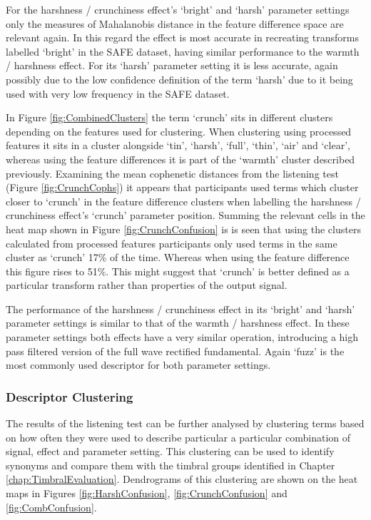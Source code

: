 			For the harshness / crunchiness effect's `bright' and `harsh' parameter settings only the measures
			of Mahalanobis distance in the feature difference space are relevant again. In this regard the
			effect is most accurate in recreating transforms labelled `bright' in the SAFE dataset, having
			similar performance to the warmth / harshness effect. For its `harsh' parameter setting it is less
			accurate, again possibly due to the low confidence definition of the term `harsh' due to it being
			used with very low frequency in the SAFE dataset.

			In Figure \ref{fig:CombinedClusters} the term `crunch' sits in different clusters depending on the
			features used for clustering. When clustering using processed features it sits in a cluster
			alongside `tin', `harsh', `full', `thin', `air' and `clear', whereas using the feature differences
			it is part of the `warmth' cluster described previously. Examining the mean cophenetic distances
			from the listening test (Figure \ref{fig:CrunchCophs}) it appears that participants used terms
			which cluster closer to `crunch' in the feature difference clusters when labelling the harshness /
			crunchiness effect's `crunch' parameter position. Summing the relevant cells in the heat map shown
			in Figure \ref{fig:CrunchConfusion} is is seen that using the clusters calculated from processed
			features participants only used terms in the same cluster as `crunch' 17\% of the time. Whereas
			when using the feature difference this figure rises to 51\%. This might suggest that `crunch' is
			better defined as a particular transform rather than properties of the output signal.

			The performance of the harshness / crunchiness effect in its `bright' and `harsh' parameter
			settings is similar to that of the warmth / harshness effect. In these parameter settings both
			effects have a very similar operation, introducing a high pass filtered version of the full wave
			rectified fundamental. Again `fuzz' is the most commonly used descriptor for both parameter
			settings.

		\subsubsection*{Descriptor Clustering}
			The results of the listening test can be further analysed by clustering terms based on how often
			they were used to describe particular a particular combination of signal, effect and parameter
			setting. This clustering can be used to identify synonyms and compare them with the timbral groups
			identified in Chapter \ref{chap:TimbralEvaluation}. Dendrograms of this clustering are shown on the
			heat maps in Figures \ref{fig:HarshConfusion}, \ref{fig:CrunchConfusion} and
			\ref{fig:CombConfusion}.

